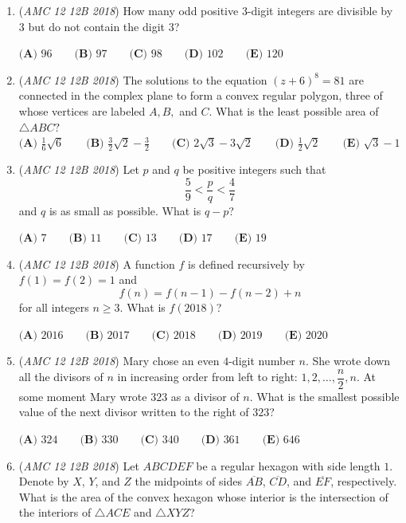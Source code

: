 \begin{enumerate}
	\item (\textit{AMC 12 12B 2018}) How many odd positive $3$-digit integers are divisible by $3$ but do not contain the digit $3$?


 $\textbf{(A) } 96 \qquad \textbf{(B) } 97 \qquad \textbf{(C) } 98 \qquad \textbf{(D) } 102 \qquad \textbf{(E) } 120$


	\item (\textit{AMC 12 12B 2018}) The solutions to the equation $(z+6)^8=81$ are connected in the complex plane to form a convex regular polygon, three of whose vertices are labeled $A,B,$ and $C$. What is the least possible area of $\triangle ABC?$
$\textbf{(A) } \frac{1}{6}\sqrt{6} \qquad \textbf{(B) } \frac{3}{2}\sqrt{2}-\frac{3}{2} \qquad \textbf{(C) } 2\sqrt3-3\sqrt2 \qquad \textbf{(D) } \frac{1}{2}\sqrt{2} \qquad \textbf{(E) } \sqrt 3-1$


	\item (\textit{AMC 12 12B 2018}) Let $p$ and $q$ be positive integers such that 
 \[\frac{5}{9} < \frac{p}{q} < \frac{4}{7}\]and $q$ is as small as possible. What is $q-p$?


 $\textbf{(A) } 7 \qquad \textbf{(B) } 11 \qquad \textbf{(C) } 13 \qquad \textbf{(D) } 17 \qquad \textbf{(E) } 19$


	\item (\textit{AMC 12 12B 2018}) A function $f$ is defined recursively by $f(1)=f(2)=1$ and 
 \[f(n)=f(n-1)-f(n-2)+n\]for all integers $n \geq 3$. What is $f(2018)$?


 $\textbf{(A) } 2016 \qquad \textbf{(B) } 2017 \qquad \textbf{(C) } 2018 \qquad \textbf{(D) } 2019 \qquad \textbf{(E) } 2020$


	\item (\textit{AMC 12 12B 2018}) Mary chose an even $4$-digit number $n$. She wrote down all the divisors of $n$ in increasing order from left to right: $1,2,\ldots,\dfrac{n}{2},n$. At some moment Mary wrote $323$ as a divisor of $n$. What is the smallest possible value of the next divisor written to the right of $323$?


 $\textbf{(A) } 324 \qquad \textbf{(B) } 330 \qquad \textbf{(C) } 340 \qquad \textbf{(D) } 361 \qquad \textbf{(E) } 646$


	\item (\textit{AMC 12 12B 2018}) Let $ABCDEF$ be a regular hexagon with side length $1$. Denote by $X$, $Y$, and $Z$ the midpoints of sides $\overline {AB}$, $\overline{CD}$, and $\overline{EF}$, respectively. What is the area of the convex hexagon whose interior is the intersection of the interiors of $\triangle ACE$ and $\triangle XYZ$?



\end{enumerate}
